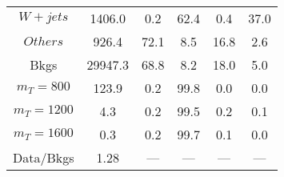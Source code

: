 \begin{figure}
\begin{minipage}[c]{0.32\textwidth}
{\begin{tabular}{cccccc}
$ W+jets $ &  1406.0 &  0.2 &  62.4 &  0.4 &  37.0\\
$ Others $ &  926.4 &  72.1 &  8.5 &  16.8 &  2.6\\
Bkgs &  29947.3 &  68.8 &  8.2 &  18.0 &  5.0\\
$ m_{T} = 800 $ &  123.9 &  0.2 &  99.8 &  0.0 &  0.0\\
$ m_{T} = 1200 $ &  4.3 &  0.2 &  99.5 &  0.2 &  0.1\\
$ m_{T} = 1600 $ &  0.3 &  0.2 &  99.7 &  0.1 &  0.0\\
Data/Bkgs &  1.28 &  --- &  --- &  --- &  ---\\
\hline
\end{tabular}
}
\end{minipage}
\end{figure}

